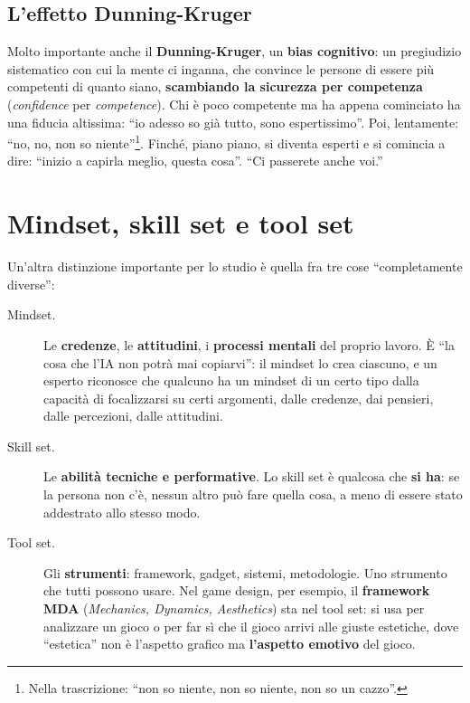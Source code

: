 \subsection{L'effetto Dunning-Kruger}

Molto importante anche il \textbf{Dunning-Kruger}, un \textbf{bias
cognitivo}: un pregiudizio sistematico con cui la mente ci inganna, che
convince le persone di essere più competenti di quanto siano,
\textbf{scambiando la sicurezza per competenza} (\emph{confidence} per
\emph{competence}). Chi è poco competente ma ha appena cominciato ha una
fiducia altissima: ``io adesso so già tutto, sono espertissimo''. Poi,
lentamente: ``no, no, non so niente''\footnote{Nella trascrizione: ``non so
niente, non so niente, non so un cazzo''.}. Finché, piano piano, si diventa
esperti e si comincia a dire: ``inizio a capirla meglio, questa cosa''.
``Ci passerete anche voi.''

\section{Mindset, skill set e tool set}
\label{p0:sec:set}

Un'altra distinzione importante per lo studio è quella fra tre cose
``completamente diverse'':
\begin{description}
  \item[Mindset.] Le \textbf{credenze}, le \textbf{attitudini}, i
        \textbf{processi mentali} del proprio lavoro. È ``la cosa che l'IA
        non potrà mai copiarvi'': il mindset lo crea ciascuno, e un esperto
        riconosce che qualcuno ha un mindset di un certo tipo dalla
        capacità di focalizzarsi su certi argomenti, dalle credenze, dai
        pensieri, dalle percezioni, dalle attitudini.
  \item[Skill set.] Le \textbf{abilità tecniche e performative}. Lo skill
        set è qualcosa che \textbf{si ha}: se la persona non c'è, nessun
        altro può fare quella cosa, a meno di essere stato addestrato allo
        stesso modo.
  \item[Tool set.] Gli \textbf{strumenti}: framework, gadget, sistemi,
        metodologie. Uno strumento che tutti possono usare. Nel game design,
        per esempio, il \textbf{framework MDA} (\emph{Mechanics, Dynamics,
        Aesthetics}) sta nel tool set: si usa per analizzare un gioco o per
        far sì che il gioco arrivi alle giuste estetiche, dove
        ``estetica'' non è l'aspetto grafico ma \textbf{l'aspetto emotivo}
        del gioco.
\end{description}

